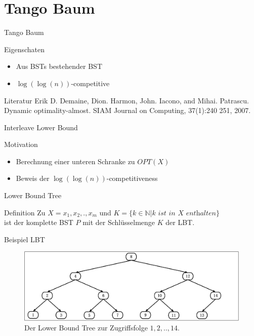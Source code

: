 \documentclass[11pt]{beamer}
\begin{document}
\section{Tango Baum}

 \begin{frame} {Tango Baum} 
 	\begin{block}{Eigenschaten}
 		\begin{itemize}
 			\item 	Aus BSTs bestehender BST
 			\item $\log\left(\log\left(n\right)\right)$-competitive		
 		\end{itemize}
    \end{block}
	\begin{block}{Literatur}
	Erik D. Demaine, Dion. Harmon, John. Iacono, and Mihai. Patrascu.
	Dynamic optimality-almost. SIAM Journal on Computing, 37(1):240
	251, 2007.
    \end{block}
\end{frame}	  
 \begin{frame} {Interleave Lower Bound} 
 	\begin{block}{Motivation}
 	\begin{itemize}
 		\item Berechnung einer unteren Schranke zu $\mathit{OPT\left(X\right)}$
 		\item Beweis der $\log\left( \log \left(n\right)\right)$-competitiveness	
 	\end{itemize}
     \end{block}
\end{frame}	  

 \begin{frame} {Lower Bound Tree} 
	\begin{block}{Definition}
		  Zu $X = x_1,x_2,.,x_m$ und $K = \{k \in \mathbb{N} \vert k \textit{ ist in $X$ enthalten}\}$\\
		  \pause
		  ist der komplette BST $P$ mit der Schlüsselmenge $K$ der LBT. 
		 
	\end{block}
\end{frame}

\begin{frame} {Beispiel LBT} 
\begin{figure}[H]
	\centering
	\includegraphics[width=1\textwidth]{"Medien/pres/lowerBoundTree"}
	\caption{Der Lower Bound Tree zur Zugriffsfolge $1 ,2, .., 14$.  }
	\label{fig:demlowerBoundTree}
\end{figure}
\end{frame}		
\end{document}
